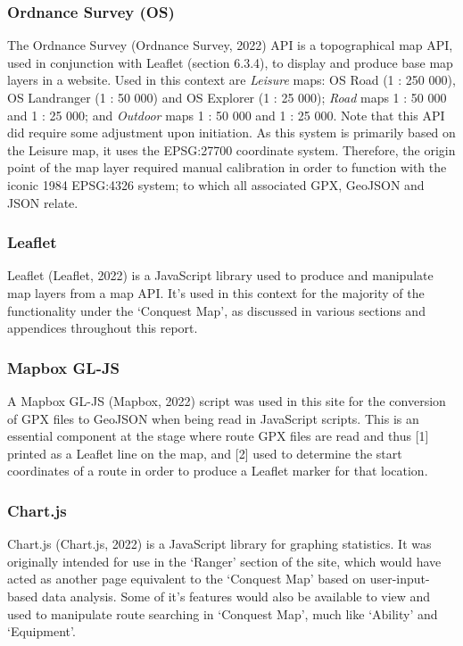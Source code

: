 \documentclass[11pt, english]{article}
\begin{document}
		\subsubsection{Ordnance Survey (OS)}

		The Ordnance Survey (Ordnance Survey, 2022) API is a topographical map API, used in conjunction with Leaflet (section 6.3.4), to display and produce base map layers in a website. Used in this context are \textit{Leisure} maps: OS Road (1 : 250 000), OS Landranger (1 : 50 000) and OS Explorer (1 : 25 000); \textit{Road} maps 1 : 50 000 and 1 : 25 000; and \textit{Outdoor} maps 1 : 50 000 and 1 : 25 000. Note that this API did require some adjustment upon initiation. As this system is primarily based on the Leisure map, it uses the EPSG:27700 coordinate system. Therefore, the origin point of the map layer required manual calibration in order to function with the iconic 1984 EPSG:4326 system; to which all associated GPX, GeoJSON and JSON relate.
		
		\subsubsection{Leaflet}

		Leaflet (Leaflet, 2022) is a JavaScript library used to produce and manipulate map layers from a map API. It's used in this context for the majority of the functionality under the `Conquest Map', as discussed in various sections and appendices throughout this report.

		\subsubsection{Mapbox GL-JS}

		A Mapbox GL-JS (Mapbox, 2022) script was used in this site for the conversion of GPX files to GeoJSON when being read in JavaScript scripts. This is an essential component at the stage where route GPX files are read and thus [1] printed as a Leaflet line on the map, and [2] used to determine the start coordinates of a route in order to produce a Leaflet marker for that location.

		\subsubsection{Chart.js}
	
		Chart.js (Chart.js, 2022) is a JavaScript library for graphing statistics. It was originally intended for use in the `Ranger' section of the site, which would have acted as another page equivalent to the `Conquest Map' based on user-input-based data analysis. Some of it's features would also be available to view and used to manipulate route searching in `Conquest Map', much like `Ability' and `Equipment'.\\
\end{document}
